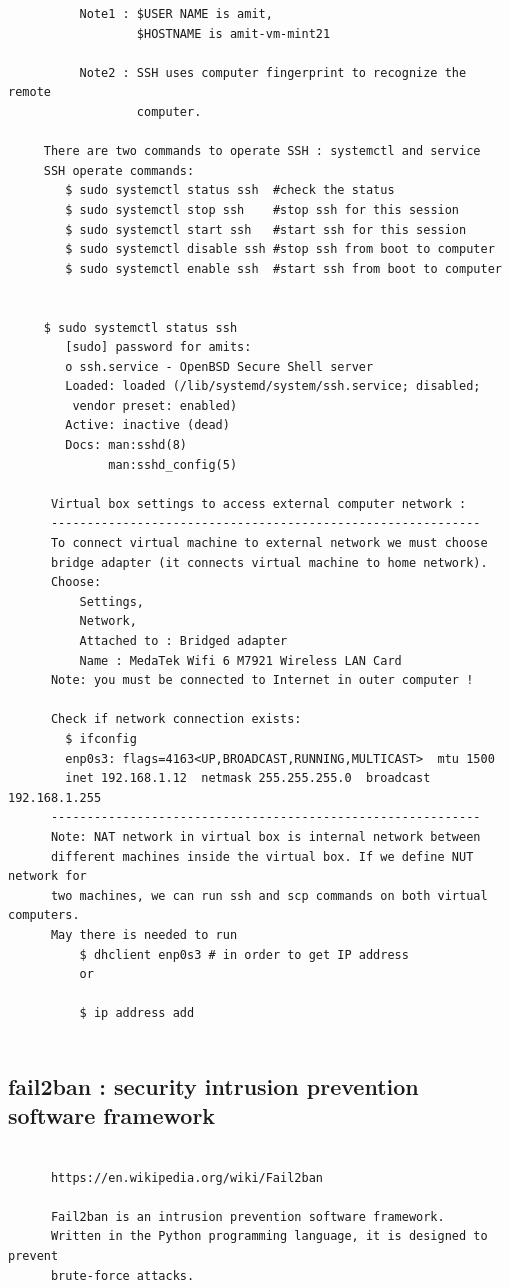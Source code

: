 \documentclass[a4paper,12pt]{article}
\begin{document}
\begin{verbatim}
          Note1 : $USER NAME is amit,
                  $HOSTNAME is amit-vm-mint21
                  
          Note2 : SSH uses computer fingerprint to recognize the remote 
                  computer.     
     
     There are two commands to operate SSH : systemctl and service
     SSH operate commands: 
        $ sudo systemctl status ssh  #check the status
        $ sudo systemctl stop ssh    #stop ssh for this session
        $ sudo systemctl start ssh   #start ssh for this session
        $ sudo systemctl disable ssh #stop ssh from boot to computer
        $ sudo systemctl enable ssh  #start ssh from boot to computer    
     

     $ sudo systemctl status ssh
        [sudo] password for amits: 
        o ssh.service - OpenBSD Secure Shell server
        Loaded: loaded (/lib/systemd/system/ssh.service; disabled;
         vendor preset: enabled)
        Active: inactive (dead)
        Docs: man:sshd(8)
              man:sshd_config(5)

      Virtual box settings to access external computer network : 
      ------------------------------------------------------------      
      To connect virtual machine to external network we must choose
      bridge adapter (it connects virtual machine to home network).
      Choose: 
          Settings, 
          Network, 
          Attached to : Bridged adapter
          Name : MedaTek Wifi 6 M7921 Wireless LAN Card  
      Note: you must be connected to Internet in outer computer !     
     
      Check if network connection exists: 
        $ ifconfig
        enp0s3: flags=4163<UP,BROADCAST,RUNNING,MULTICAST>  mtu 1500
        inet 192.168.1.12  netmask 255.255.255.0  broadcast 192.168.1.255
      ------------------------------------------------------------
      Note: NAT network in virtual box is internal network between
      different machines inside the virtual box. If we define NUT network for
      two machines, we can run ssh and scp commands on both virtual computers.
      May there is needed to run 
          $ dhclient enp0s3 # in order to get IP address  
          or
          
          $ ip address add
     
\end{verbatim}

\subsection{fail2ban :  security intrusion prevention software framework}
\begin{verbatim}

      https://en.wikipedia.org/wiki/Fail2ban

      Fail2ban is an intrusion prevention software framework. 
      Written in the Python programming language, it is designed to prevent   
      brute-force attacks.    
\end{verbatim}
\end{document}
